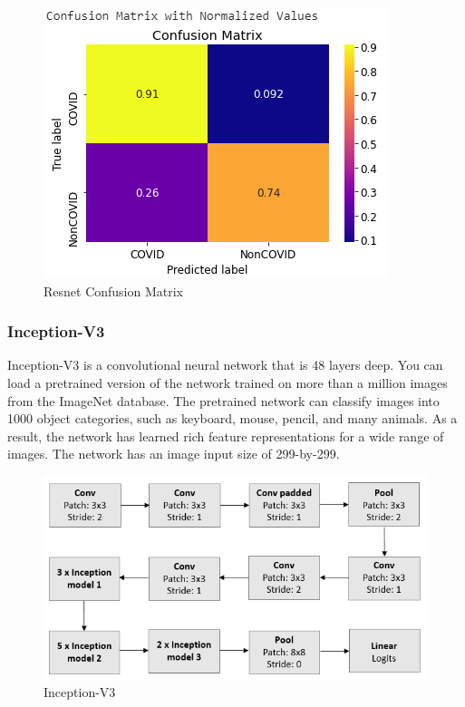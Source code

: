 \documentclass[a4paper,12pt]{report}
\begin{document}
  \begin{figure}[h] %
   \begin{center}
   \includegraphics[scale=0.6]{resnet_chest_cm.png}
   \caption{Resnet Confusion Matrix}
  \end{center}
  \end{figure}
    \pagebreak
  \subsubsection{Inception-V3}
Inception-V3 is a convolutional neural network that is 48 layers deep. You can load a pretrained version of the network trained on more than a million images from the ImageNet database. The pretrained network can classify images into 1000 object categories, such as keyboard, mouse, pencil, and many animals. As a result, the network has learned rich feature representations for a wide range of images. The network has an image input size of 299-by-299.
\begin{figure}[h] %
   \begin{center}
   \includegraphics[scale=0.5]{inception.png}
   \caption{Inception-V3}
  \end{center}
  \end{figure}
\end{document}
